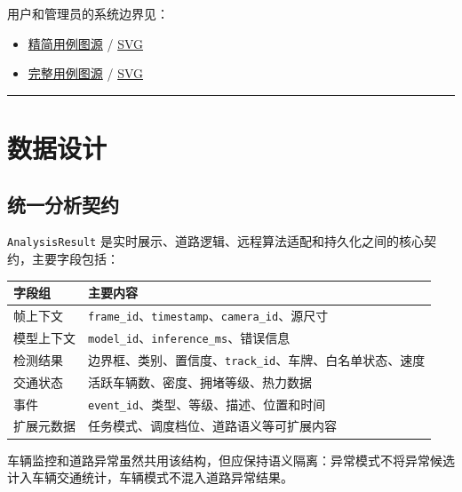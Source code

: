 用户和管理员的系统边界见：

\begin{itemize}
\tightlist
\item
  \href{diagrams/use-case-overview.puml}{精简用例图源} / \href{../../output/ppt-assets/diagrams/use-case-overview.svg}{SVG}
\item
  \href{diagrams/use-case.puml}{完整用例图源} / \href{../../output/ppt-assets/diagrams/use-case.svg}{SVG}
\end{itemize}

\begin{center}\rule{0.5\linewidth}{0.5pt}\end{center}

\section{数据设计}\label{design-ux6570ux636eux8bbeux8ba1}

\subsection{统一分析契约}\label{design-ux7edfux4e00ux5206ux6790ux5951ux7ea6}

\texttt{Analysis\allowbreak{}Result} 是实时展示、道路逻辑、远程算法适配和持久化之间的核心契约，主要字段包括：

\begin{longtable}[]{@{}ll@{}}
\toprule\noalign{}
字段组 & 主要内容 \\
\midrule\noalign{}
\endhead
\bottomrule\noalign{}
\endlastfoot
帧上下文 & \texttt{frame\_\allowbreak{}id}、\texttt{timestamp}、\texttt{camera\_\allowbreak{}id}、源尺寸 \\
模型上下文 & \texttt{model\_\allowbreak{}id}、\texttt{inference\_\allowbreak{}ms}、错误信息 \\
检测结果 & 边界框、类别、置信度、\texttt{track\_\allowbreak{}id}、车牌、白名单状态、速度 \\
交通状态 & 活跃车辆数、密度、拥堵等级、热力数据 \\
事件 & \texttt{event\_\allowbreak{}id}、类型、等级、描述、位置和时间 \\
扩展元数据 & 任务模式、调度档位、道路语义等可扩展内容 \\
\end{longtable}

车辆监控和道路异常虽然共用该结构，但应保持语义隔离：异常模式不将异常候选计入车辆交通统计，车辆模式不混入道路异常结果。

